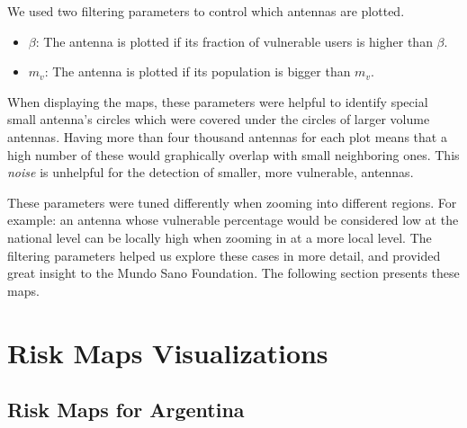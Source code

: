 We used two filtering parameters to control which antennas are plotted.
\begin{itemize}
	\item $\beta$: The antenna is plotted if its fraction of vulnerable users is higher than $\beta$.
	\item $m_v$: The antenna is plotted if its population is bigger than $m_v$.
\end{itemize}

When displaying the maps, these parameters were helpful to identify special small antenna's circles which were covered under the circles of larger volume antennas.
Having more than four thousand antennas for each plot means that a high number of these would graphically overlap with small neighboring ones.
This \textit{noise} is unhelpful for the detection of smaller, more vulnerable, antennas.

These parameters were tuned differently when zooming into different regions.
For example: an antenna whose vulnerable percentage would be considered low at the national level can be locally high when zooming in at a more local level.
The filtering parameters helped us explore these cases in more detail, and provided great insight to the Mundo Sano Foundation.
The following section presents these maps.

\section{Risk Maps Visualizations}\label{section:riskmaps}

\subsection{Risk Maps for Argentina}


